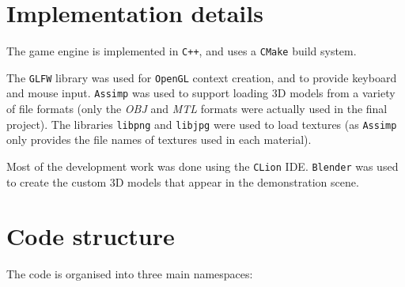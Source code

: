 \documentclass[11pt]{scrartcl} %
\newcommand{\libraryname}[1]{{\texttt{#1}}}
\newcommand{\codefile}[1]{{\textit{#1}}}
\begin{document}
\section{Implementation details}


    The game engine is implemented in \libraryname{C++}, and uses a
    \libraryname{CMake} build system.


    The \libraryname{GLFW} library was used for \libraryname{OpenGL} context
    creation, and to provide keyboard and mouse input.
%
    \libraryname{Assimp} was used to support loading 3D models from a variety
    of file formats (only the \codefile{OBJ} and \codefile{MTL} formats were
    actually used in the final project).
%
    The libraries \libraryname{libpng} and \libraryname{libjpg} were used to
    load textures (as \libraryname{Assimp} only provides the file names of
    textures used in each material).


    Most of the development work was done using the \libraryname{CLion} IDE.
    \libraryname{Blender} was used to create the custom 3D models that appear
    in the demonstration scene.


\section{Code structure}

    The code is organised into three main namespaces:
\end{document}
